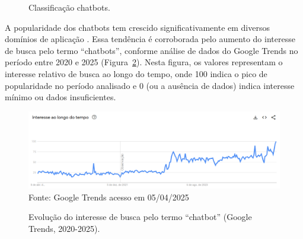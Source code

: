 \documentclass[14pt,a4paper,oneside]{book}
\begin{document}
\begin{figure}
	\centering
	\caption{Classificação chatbots.}
	\label{fig:tipo}
\end{figure}

A popularidade dos chatbots tem crescido significativamente em diversos domínios de aplicação \cite{B2020, Klopfenstein2017, Sharma2020}. Essa tendência é corroborada pelo aumento do interesse de busca pelo termo ``chatbots'', conforme análise de dados do Google Trends no período entre 2020 e 2025 (Figura~\ref{fig:trends}). Nesta figura, os valores representam o interesse relativo de busca ao longo do tempo, onde 100 indica o pico de popularidade no período analisado e 0 (ou a ausência de dados) indica interesse mínimo ou dados insuficientes.

\begin{figure}[!hbp]
	\centering
	\caption{Evolução do interesse de busca pelo termo ``chatbot'' (Google Trends, 2020-2025).}
	\includegraphics[width=1\linewidth]{fig/trends.png}
	\label{fig:trends}
	{\footnotesize Fonte: Google Trends acesso em 05/04/2025} %
\end{figure}

\end{document}
